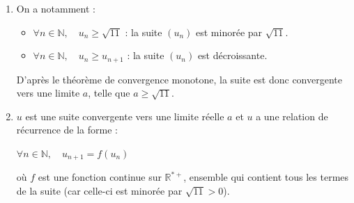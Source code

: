 \documentclass[10pt]{article}
\providecommand{\R}{\mathbb{R}}
\providecommand{\N}{\mathbb{N}}
\begin{document}
\begin{enumerate}
Pour tout entier naturel $n$, on s'intéresse à l'inégalité : $ u_{n} \geqslant u_{n+1} \geqslant \sqrt{11}$.

\emph{Initialisation :} Pour $n = 0$, on a $u_n = 5$ et $u_{n+1} = u_1 = \dfrac{18}{5} = 3,6$ et par ailleurs, on a $\sqrt{11}\approx 3,32$ donc on a bien $u_0\geqslant u_1 \geqslant\sqrt{11}$. L'inégalité est vraie à l'indice 0.

		\emph{Hérédité :} Pour un entier naturel $n$ quelconque fixé, on suppose que l'inégalité est vraie pour l'indice $n$, c'est-à-dire que l'on a : $ u_{n} \geqslant u_{n+1} \geqslant \sqrt{11}$.

		 $\begin{aligned} u_{n} \geqslant u_{n+1} \geqslant \sqrt{11}
		 	&\implies f(u_n) \geqslant f(u_{n+1}) \geqslant f\left(\sqrt{11}\right) \qquad \text{car  }f\text{ est croissante sur }\left[\sqrt{11}~;~+\infty \right[\\
		 	&\implies u_{n+1}\geqslant u_{n+2} \geqslant \sqrt{11} \qquad \text{grâce aux éléments de la remarque}\\ \end{aligned}$

\emph{Conclusion :} On a montré que l'inégalité est vraie pour l'indice 0, et que, pour tout entier naturel $n$ la véracité est héréditaire de l'indice $n$ à l'indice $(n+1)$. En vertu du principe de récurrence, on peut en déduire que :

Pour tout $n$ naturel, on a : $u_{n} \geqslant u_{n+1} \geqslant \sqrt{11}$.

\item On a notamment :
\begin{itemize}
\item $\forall n \in \N, \quad u_n\geqslant \sqrt{11}$ : la suite $(u_n)$ est minorée par $\sqrt{11}$.

\item $\forall n \in \N, \quad u_n\geqslant u_{n+1}$ : la suite $(u_n)$ est décroissante.
\end{itemize}

D'après le théorème de convergence monotone, la suite est donc convergente vers une limite $a$, telle que $a \geqslant\sqrt{11}$.

	\item $u$ est une suite convergente vers une limite réelle $a$ et $u$ a une relation de récurrence de la forme :

$\forall n \in \N, \quad u_{n+1}=f(u_n)$

où $f$ est une fonction continue sur $\R^{*+}$, ensemble qui contient tous les termes de la suite (car celle-ci est minorée par $\sqrt{11}>0$).


\end{enumerate}
\end{document}

